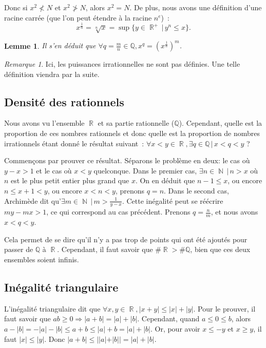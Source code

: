 \documentclass{article}
\DeclareMathOperator{\R}{\mathbb R}
\DeclareMathOperator{\N}{\mathbb N}
\newtheorem{lem}[thm]{Lemme}
\theoremstyle{definition}
\theoremstyle{remark}
\newtheorem*{rmq}{Remarque}
\begin{document}
			Donc si $x^2 \not < N$ et $x^2 \not > N$, alors $x^2 = N$. De plus, nous avons une définition d'une racine carrée (que l'on peut étendre à
			la racine $n^e$)~:
			\[x^\frac 1n = \sqrt[n] x = \sup \{y \in \R^+ \, | \, y^n \leq x\}.\]

			\begin{lem} Il s'en déduit que $\forall q = \frac mn \in \mathbb Q, x^q = (x^{\frac 1n})^m$. \end{lem}

			\begin{rmq} Ici, les puissances irrationnelles ne sont pas définies. Une telle définition viendra par la suite. \end{rmq}

	\subsection{Densité des rationnels}
		Nous avons vu l'ensemble $\R$ et sa partie rationnelle ($\mathbb Q$). Cependant, quelle est la proportion de ces nombres rationnels
		et donc quelle est la proportion de nombres irrationnels étant donné le résultat suivant~: $\forall x < y \in \R, \exists q \in \mathbb Q \, | \, x < q < y$ ?

		Commençons par prouver ce résultat. Séparons le problème en deux: le cas où $y - x > 1$ et le cas où $x < y$ quelconque. Dans le premier cas,
		$\exists n \in \N \, | \, n > x$ où $n$ est le plus petit entier plus grand que $x$. On en déduit que $n-1 \leq x$, ou encore
		$n \leq x + 1 < y$, ou encore $x < n < y$, prenons $q = n$. Dans le second cas, Archimède dit qu'$\exists m \in \N \, | \, m > \frac {1}{y - x}$.
		Cette inégalité peut se réécrire $my - mx > 1$, ce qui correspond au cas précédent. Prenons $q = \frac nm$, et nous avons $x < q < y$.

		Cela permet de se dire qu'il n'y a pas trop de points qui ont été ajoutés pour passer de $\mathbb Q$ à $\R$. Cependant, il faut savoir
		que $\#\R > \#\mathbb Q$, bien que ces deux ensembles soient infinis.

	\subsection{Inégalité triangulaire}
		L'inégalité triangulaire dit que $\forall x, y \in \R, |x + y| \leq |x| + |y|$. Pour le prouver, il faut savoir que $ab \geq 0 \Rightarrow |a + b| = |a| + |b|$.
		Cependant, quand $a \leq 0 \leq b$, alors $a - |b| = - |a| - |b| \leq a + b \leq |a| + b = |a| + |b|$. Or, pour avoir $x \leq -y$ et $x \geq y$,
		il faut $|x| \leq |y|$. Donc $|a + b| \leq ||a| + |b|| = |a| + |b|$.
\end{document}
